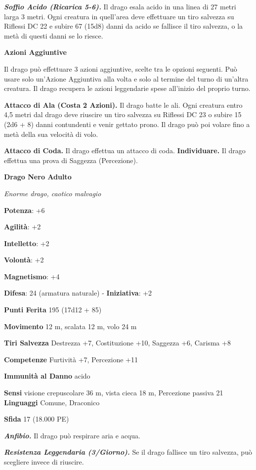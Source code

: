 \begin{multicols}{2}
\emph{\textbf{Soffio Acido (Ricarica 5-6).}} Il drago esala acido in una
linea di 27 metri larga 3 metri. Ogni creatura in quell'area deve
effettuare un tiro salvezza su Riflessi DC 22 e subire 67 (15d8) danni
da acido se fallisce il tiro salvezza, o la metà di questi danni se lo
riesce.

\textbf{Azioni Aggiuntive}

Il drago può effettuare 3 azioni aggiuntive, scelte tra le opzioni
seguenti. Può usare solo un'Azione Aggiuntiva alla volta e solo al
termine del turno di un'altra creatura. Il drago recupera le azioni
leggendarie spese all'inizio del proprio turno.

\textbf{Attacco di Ala (Costa 2 Azioni).} Il drago batte le ali. Ogni
creatura entro 4,5 metri dal drago deve riuscire un tiro salvezza su Riflessi DC 23 o subire 15 (2d6 + 8) danni contundenti e venir gettato
prono. Il drago può poi volare fino a metà della sua velocità di volo.

\textbf{Attacco di Coda.} Il drago effettua un attacco di coda.
\textbf{Individuare.} Il drago effettua una prova di Saggezza
(Percezione).



\textbf{Drago Nero Adulto}

\emph{Enorme drago, caotico malvagio}

\textbf{Potenza}: +6

\textbf{Agilità}: +2

\textbf{Intelletto}: +2

\textbf{Volontà}: +2

\textbf{Magnetismo}: +4

\textbf{Difesa}: 24 (armatura naturale) - \textbf{Iniziativa}: +2

\textbf{Punti Ferita} 195 (17d12 + 85)

\textbf{Movimento} 12 m, scalata 12 m, volo 24 m

\textbf{Tiri Salvezza} Destrezza +7, Costituzione +10, Saggezza +6,
Carisma +8

\textbf{Competenze} Furtività +7, Percezione +11

\textbf{Immunità al Danno} acido

\textbf{Sensi} visione crepuscolare 36 m, vista cieca 18 m, Percezione passiva
21 \textbf{Linguaggi} Comune, Draconico

\textbf{Sfida} 17 (18.000 PE)

\emph{\textbf{Anfibio.}} Il drago può respirare aria e acqua.

\emph{\textbf{Resistenza Leggendaria (3/Giorno).}} Se il drago fallisce
un tiro salvezza, può scegliere invece di riuscire.


\end{multicols}
